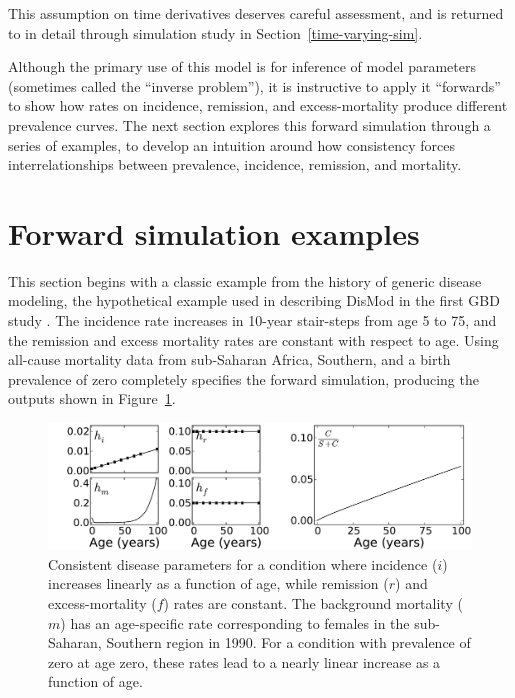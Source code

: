 This assumption on time derivatives deserves careful assessment, and
is returned to in detail through simulation study in
Section~\ref{time-varying-sim}.

Although the primary use of this model is for inference of model
parameters (sometimes called the ``inverse problem''), it is
instructive to apply it ``forwards'' to show how rates on incidence,
remission, and excess-mortality produce different prevalence
curves. The next section explores this forward simulation through a
series of examples, to develop an intuition around how consistency
forces interrelationships between prevalence, incidence, remission,
and mortality.


\section{Forward simulation examples}

This section begins with a classic example from the history of generic
disease modeling, the hypothetical example used in describing DisMod
in the first GBD study
\cite{harvard_school_of_public_health.;world_health_organization.;world_bank._global_1996}
. The incidence rate increases in 10-year stair-steps from age 5 to
75, and the remission and excess mortality rates are constant with
respect to age.  Using all-cause mortality data from sub-Saharan
Africa, Southern, and a birth prevalence of zero completely specifies
the forward simulation, producing the outputs shown in
Figure~\ref{forward-sim-ex1}.

\begin{figure}[h]
\begin{center}
\includegraphics[width=\textwidth]{initial.pdf}
\caption{Consistent disease parameters for a condition where incidence
  ($i$) increases linearly as a function of age, while remission ($r$)
  and excess-mortality ($f$) rates are constant. The background
  mortality ($m$) has an age-specific rate corresponding to females in
  the sub-Saharan, Southern region in 1990. For a condition with
  prevalence of zero at age zero, these rates lead to a nearly linear
  increase as a function of age.}
\label{forward-sim-ex1}
\end{center}
\end{figure}

